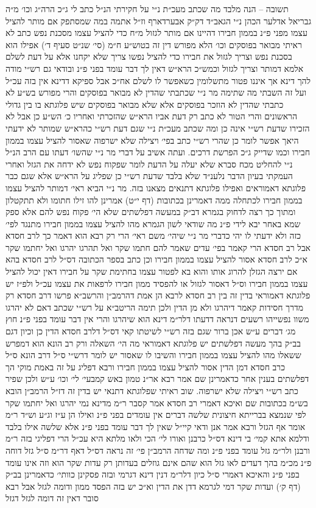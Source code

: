 \documentclass[12pt, openany]{book}
\begin{document}
\begin{multicols}{2}
תשובה – הנה מלבד מה שכתב מעכ״ת נ״י על חקירתי הנ״ל כתב לי ג״כ הרה״ג וכו׳ מ״ה גבריאל אדלער הכהן נ״י הגאב״ד דק״ק אבערדארף וז״ל אתמה במה שמסתפק אם מותר להציל עצמו מפני פ״נ בממון חבירו דהיינו אם מותר לגזול מ״ח כדי להציל עצמו מסכנת נפש כתב לא ראיתי מבואר בפוסקים וכו׳ הלא מפורש דין זה בטוש״ע ח״מ (סי׳ שנ״ט סעיף ד׳) אפילו הוא בסכנת נפש וצריך לגזול את חבירו כדי להציל נפשו צריך שלא יקחנו אלא על דעת לשלם אלמא דמותר וצריך לגזול וכמש״כ הרא״ש דאין לך דבר עומד בפני פ״נ ובודאי גם רש״י מודה להך דינא אך איננו פטור מתשלומין כשאפשר לו לשלם אח״כ אבל ספיקא דדינא אין בזה עכ״ל ועל זה השבתי מה שתימה מר נ״י שכתבתי שהדין לא מבואר בפוסקים והרי מפורש בש״ע לא כתבתי שהדין לא הוזכר בפוסקים אלא שלא מבואר בפוסקים שיש פלוגתא בו בין גדולי הראשונים והרי הטור לא כתב רק דעת אביו הרא״ש שהזכרתי ואחריו כ׳ הש״ע כן אבל לא הזכירו שדעת רש״י אינה כן ומה שכתב מעכ״ת נ״י שגם דעת רש״י כהרא״ש שמותר לא ידעתי היאך אפשר לומר כן שהרי רש״י כתב בפי׳ ויצילה שלא ישרפוה שאסור להציל עצמו בממון חבירו וכמו שדייק ג״כ הפרשת דרכים. ועתה אשיב על דברי מר נ״י שהשו׳ דעתו עם הרב הנ״ל נ״י להחליט מכח סברא שלא יעלה על הדעת לומר שפקוח נפש לא ידחה את הגזל ואחרי העמקתי בעיון הדבר נלענ״ד שלא בלבד שדעת רש״י כן שפליג על הרא״ש אלא שגם כבר פלוגתא דאמוראים ואפילו פלוגתא דתנאים מצאנו בזה. מר נ״י הביא ראי׳ דמותר להציל עצמו בממון חבירו לכתחלה ממה דאמרינן בכתובות (דף י״ט) אמרינן להו זילו חתומו ולא תתקטלון ומתוך כך רצה לדחוק בגמרא דב״ק במעשה דפלשתים שלא הי׳ פקוח נפש להם אלא ספק שמא באחר יבא לידי פ״נ מה שודאי לשון הגמרא מהו להציל עצמו בממון חבירו מתנגד לפי׳ כזה ולא ידעתי לו יהי כדברי מר נ״י שיהי׳ משם ראי׳ הרי רק רבא הוא דאמר כך לרב חסדא אבל רב חסדא הרי קאמר בפי׳ עדים שאמר להם חתמו שקר ואל תהרגו יהרגו ואל יחתמו שקר א״כ לרב חסדא אסור להציל עצמו בממון חבירו וכן כתב בספר הכתובה דס״ל לרב חסדא בהא אם ירצה הגזלן להרוג אותו והוא בא לפטור עצמו בחתימת שקר על חבירו דאין יכול להציל עצמו בממון חבירו וס״ל דאסור לגזול או להפסיד ממון חבירו לרפאות את עצמו עכ״ל ולפ״ז יש פלוגתא דאמוראי בדין זה בין רב חסדא לרבא הן אמת דהרמב״ן והרשב״א פרשו דרב חסדא רק מדרך חסידות קאמר דיהרגו ולא מן הדין ולכן תימה הריטב״א על רש״י שכתב דאם לא יהרגו משוו נפשייהו רשעים דנראה דדעתו דלר״מ דינא הוא שיהרגו והרי אין דבר עומד בפני פ״נ חוץ מג׳ דברים ע״ש אכן ברור שגם בזה רש״י לשיטתו קאי דס״ל דלרב חסדא הדין כן וכיון דגם בב״ק בהך מעשה דפלשתים יש פלוגתא דאמוראי מה הי׳ השאלה ורק רב הונא הוא דמפרש ששאלו מהו להציל עצמו בממון חבירו והשיבו לו שאסור יש לומר דרש״י ס״ל דרב הונא ס״ל כרב חסדא דמן הדין אסור להציל עצמו בממון חבירו ורבא דפליג על זה באמת מוקי הך דפלשתים בענין אחר כדאמרינן שם אמר רבא אר״נ טמון באש קמבעי׳ לי׳ וכו׳ ע״ש ולכן שפיר כתב רש״י ויצילה שלא ישרפוה. שוב ראיתי שפלוגתא דתנאי יש בדין זה דז״ל הרמב״ן הובא בש״מ בכתובות שם ואיכא דאמרי רב חסדא אמר קסבר ר״מ מדינא נמי יהרגו ואל יחתמו שקר לפי שנמצא בברייתא חיצונית שלשה דברים אין עומדים בפני פ״נ ואילו הן ע״ז וג״ע וש״ד ר״מ אומר אף הגזל ורבא אמר אנן ודאי קיי״ל שאין לך דבר עומד בפני פ״נ אלא שלשה אילו בלבד ודלמא אתא קמי׳ בי דינא דס״ל כרבנן ואורו לי׳ הכי ולאו מלתא היא עכ״ל הרי דפליגי בזה ר״מ ורבנן ולר״מ גזל עומד בפני פ״נ ומה שדחה הרמב״ן פי׳ זה נראה דס״ל דאף דר״מ ס״ל גזל דוחה פ״נ מכ״מ בהך דעדים לאו גזל הוא שהם אינם גוזלים בעדותן רק עדות שקר הוא וזה אינו עומד בפני פ״נ והאיכא דאמרי ס״ל כיון דלר״מ דנין דינא דגרמי ובזה פסקינן כוותי׳ כדאמרינן בב״ק (דף ק׳) ועדות שקר דמי לגרמא דדן את הדין וא״כ יש בזה הפסד ממון ודומה לגזל אבל רבא סובר דאין זה דומה לגזל דגזל 
\end{multicols}
\end{document}
